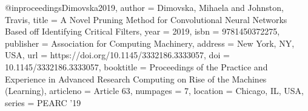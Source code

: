 @inproceedings{Dimovska2019,
  author = {Dimovska, Mihaela and Johnston, Travis},
  title = {A Novel Pruning Method for Convolutional Neural Networks Based off Identifying Critical Filters},
  year = {2019},
  isbn = {9781450372275},
  publisher = {Association for Computing Machinery},
  address = {New York, NY, USA},
  url = {https://doi.org/10.1145/3332186.3333057},
  doi = {10.1145/3332186.3333057},
  booktitle = {Proceedings of the Practice and Experience in Advanced Research Computing on Rise of the Machines (Learning)},
  articleno = {Article 63},
  numpages = {7},
  location = {Chicago, IL, USA},
  series = {PEARC ’19}
}


